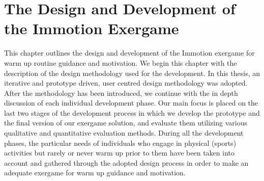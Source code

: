 \chapter{The Design and Development of the Immotion Exergame}\label{chapter:implementation}

This chapter outlines the design and development of the Immotion exergame for warm up routine guidance and motivation. We begin this chapter with the description of the design methodology used for the development. In this thesis, an iterative and prototype driven, user centred design methodology was adopted. After the methodology has been introduced, we continue with the in depth discussion of each individual development phase. Our main focus is placed on the last two stages of the development process in which we develop the prototype and the final version of our exergame solution, and evaluate them utilizing various qualitative and quantitative evaluation methods. During all the development phases, the particular needs of individuals who engage in physical (sports) activities but rarely or never warm up prior to them have been taken into account and gathered through the adopted design process in order to make an adequate exergame for warm up guidance and motivation.
